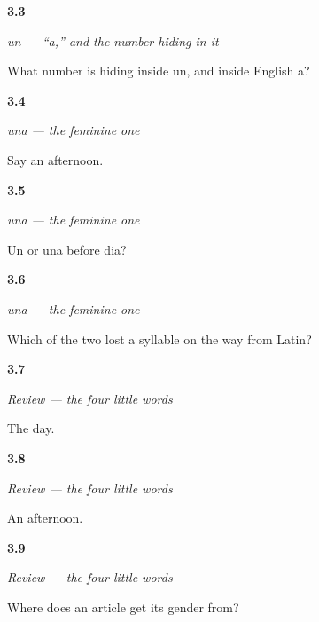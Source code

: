 \noindent\begin{minipage}[t]{\linewidth}
\raggedright
\hypertarget{review-ES-C02-un-number}{\textbf{3.3}} \emph{un — \textquotedblleft{}a,\textquotedblright{} and the number hiding in it}\par
\small What number is hiding inside un, and inside English a?
\end{minipage}\par\medskip

\noindent\begin{minipage}[t]{\linewidth}
\raggedright
\hypertarget{review-ES-C02-una-tarde}{\textbf{3.4}} \emph{una — the feminine one}\par
\small Say an afternoon.
\end{minipage}\par\medskip

\noindent\begin{minipage}[t]{\linewidth}
\raggedright
\hypertarget{review-ES-C02-una-which}{\textbf{3.5}} \emph{una — the feminine one}\par
\small Un or una before dia?
\end{minipage}\par\medskip

\noindent\begin{minipage}[t]{\linewidth}
\raggedright
\hypertarget{review-ES-C02-una-worn}{\textbf{3.6}} \emph{una — the feminine one}\par
\small Which of the two lost a syllable on the way from Latin?
\end{minipage}\par\medskip

\noindent\begin{minipage}[t]{\linewidth}
\raggedright
\hypertarget{review-ES-C02-repaso-articulos-the-day}{\textbf{3.7}} \emph{Review — the four little words}\par
\small The day.
\end{minipage}\par\medskip

\noindent\begin{minipage}[t]{\linewidth}
\raggedright
\hypertarget{review-ES-C02-repaso-articulos-an-afternoon}{\textbf{3.8}} \emph{Review — the four little words}\par
\small An afternoon.
\end{minipage}\par\medskip

\noindent\begin{minipage}[t]{\linewidth}
\raggedright
\hypertarget{review-ES-C02-repaso-articulos-where}{\textbf{3.9}} \emph{Review — the four little words}\par
\small Where does an article get its gender from?
\end{minipage}\par\medskip

